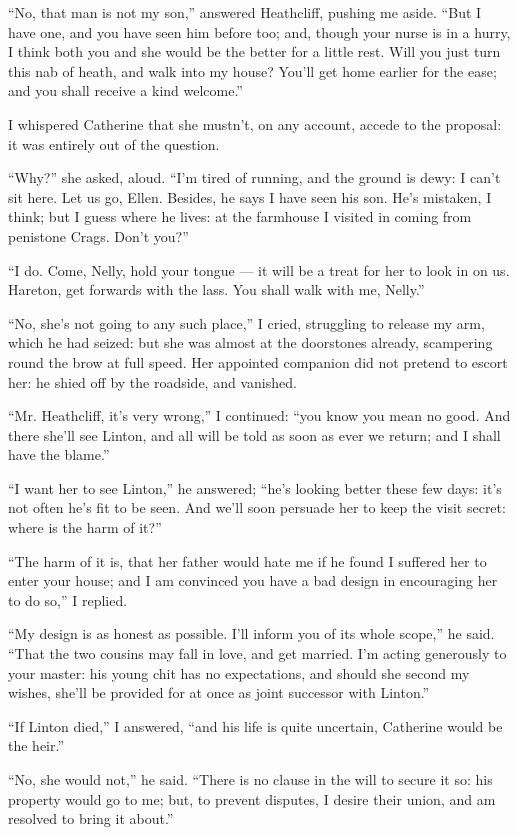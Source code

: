 \par “No, that man is not my son,” answered Heathcliff, pushing me aside. “But I have one, and you have seen him before too; and, though your nurse is in a hurry, I think both you and she would be the better for a little rest. Will you just turn this nab of heath, and walk into my house? You'll get home earlier for the ease; and you shall receive a kind welcome.”
\par I whispered Catherine that she mustn't, on any account, accede to the proposal: it was entirely out of the question.
\par “Why?” she asked, aloud. “I'm tired of running, and the ground is dewy: I can't sit here. Let us go, Ellen. Besides, he says I have seen his son. He's mistaken, I think; but I guess where he lives: at the farmhouse I visited in coming from penistone Crags. Don't you?”
\par “I do. Come, Nelly, hold your tongue — it will be a treat for her to look in on us. Hareton, get forwards with the lass. You shall walk with me, Nelly.”
\par “No, she's not going to any such place,” I cried, struggling to release my arm, which he had seized: but she was almost at the doorstones already, scampering round the brow at full speed. Her appointed companion did not pretend to escort her: he shied off by the roadside, and vanished.
\par “Mr. Heathcliff, it's very wrong,” I continued: “you know you mean no good. And there she'll see Linton, and all will be told as soon as ever we return; and I shall have the blame.”
\par “I want her to see Linton,” he answered; “he's looking better these few days: it's not often he's fit to be seen. And we'll soon persuade her to keep the visit secret: where is the harm of it?”
\par “The harm of it is, that her father would hate me if he found I suffered her to enter your house; and I am convinced you have a bad design in encouraging her to do so,” I replied.
\par “My design is as honest as possible. I'll inform you of its whole scope,” he said. “That the two cousins may fall in love, and get married. I'm acting generously to your master: his young chit has no expectations, and should she second my wishes, she'll be provided for at once as joint successor with Linton.”
\par “If Linton died,” I answered, “and his life is quite uncertain, Catherine would be the heir.”
\par “No, she would not,” he said. “There is no clause in the will to secure it so: his property would go to me; but, to prevent disputes, I desire their union, and am resolved to bring it about.”
